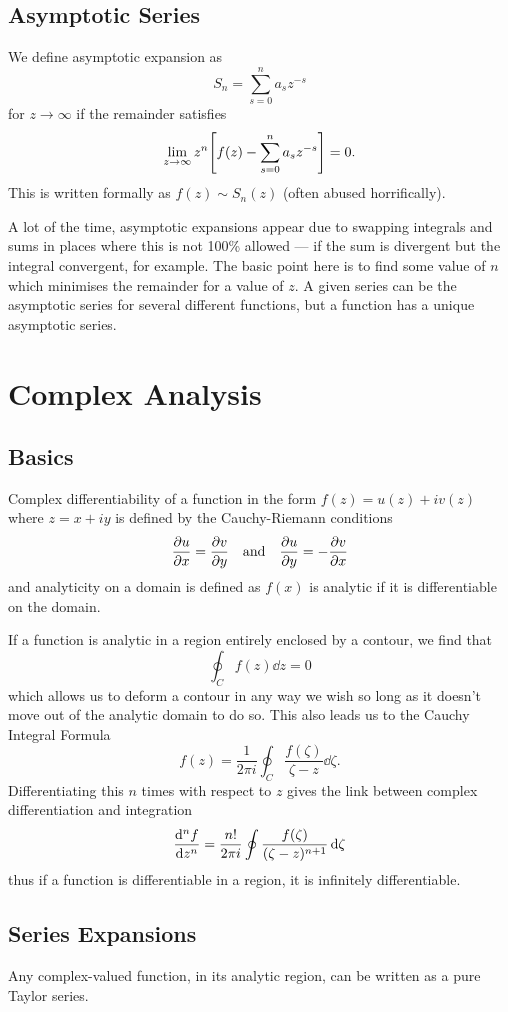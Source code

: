 \documentclass[a4paper,12pt,parskip=full,BCOR=1cm]{scrreprt}
\begin{document}
\section{Asymptotic Series}
We define asymptotic expansion as
$$ S_n= \sum_{s=0}^n a_s z^{-s}$$ for $z \rightarrow \infty$ if the remainder satisfies
$$ \lim_{z\rightarrow\infty} z^n \qty[f(z) - \sum_{s=0}^n a_s z^{-s}] = 0.$$
This is written formally as $f(z) \sim S_n(z)$ (often abused horrifically).

A lot of the time, asymptotic expansions appear due to swapping integrals and sums in places where this is not 100\% allowed --- if the sum is divergent but the integral convergent, for example.
The basic point here is to find some value of $n$ which minimises the remainder for a value of $z$.
A given series can be the asymptotic series for several different functions, but a function has a unique asymptotic series.

\chapter{Complex Analysis}
\section{Basics}
Complex differentiability of a function in the form $f(z) = u(z) + iv(z)$ where $z=x+iy$ is defined by the Cauchy-Riemann conditions $$ \pdv{u}{x}= \pdv{v}{y} \quad \textrm{and} \quad \pdv{u}{y} = - \pdv{v}{x} $$ and analyticity on a domain is defined as $f(x)$ is analytic if it is differentiable on the domain.

If a function is analytic in a region entirely enclosed by a contour, we find that
\begin{equation*}
 \oint_C f(z) \dd{z} = 0
\end{equation*}
which allows us to deform a contour in any way we wish so long as it doesn't move out of the analytic domain to do so.
This also leads us to the Cauchy Integral Formula
\begin{equation*}
 f(z) = \frac{1}{2\pi i}\oint_C \frac{f(\zeta)}{\zeta-z} \dd{\zeta}.
\end{equation*}
Differentiating this $n$ times with respect to $z$ gives the link between complex differentiation and integration $$ \dv[n]{f}{z} = \frac{n!}{2\pi i} \oint \frac{f(\zeta)}{(\zeta - z)^{n+1}} \dd{\zeta}$$ thus if a function is differentiable in a region, it is infinitely differentiable.

\section{Series Expansions}
Any complex-valued function, in its analytic region, can be written as a pure Taylor series.
\end{document}
